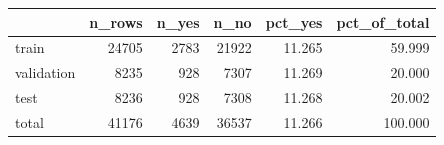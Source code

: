 \begin{tabular}{lrrrrr}
\toprule
 & n\_rows & n\_yes & n\_no & pct\_yes & pct\_of\_total \\
\midrule
train & 24705 & 2783 & 21922 & 11.265 & 59.999 \\
validation & 8235 & 928 & 7307 & 11.269 & 20.000 \\
test & 8236 & 928 & 7308 & 11.268 & 20.002 \\
total & 41176 & 4639 & 36537 & 11.266 & 100.000 \\
\bottomrule
\end{tabular}
